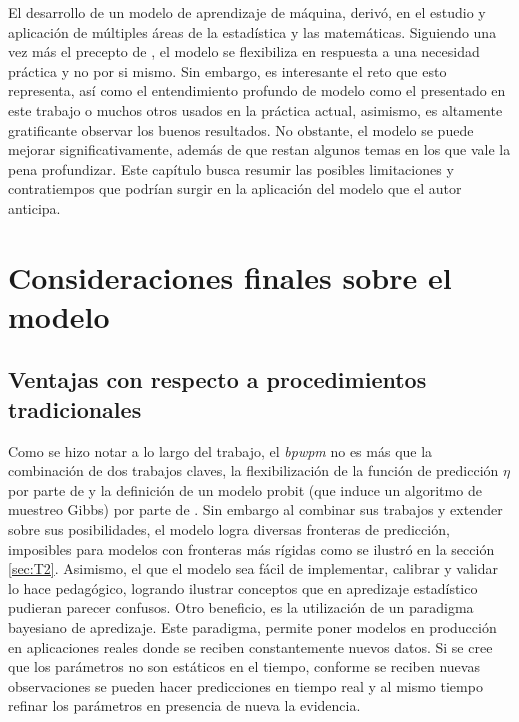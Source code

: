 \documentclass[../Main/Main.tex]{subfiles}
\begin{document}
El desarrollo de un modelo de aprendizaje de máquina, derivó, en el estudio y aplicación de múltiples áreas de la estadística y las matemáticas. Siguiendo una vez más el precepto de \citet{box1976science}, el modelo se flexibiliza en respuesta a una necesidad práctica y no por si mismo. Sin embargo, es interesante el reto que esto representa, así como el entendimiento profundo de modelo como el presentado en este trabajo o muchos otros usados en la práctica actual, asimismo, es altamente gratificante observar los buenos resultados. No obstante, el modelo se puede mejorar significativamente, además de que restan algunos temas en los que vale la pena profundizar. Este capítulo busca resumir las posibles limitaciones y contratiempos que podrían surgir en la aplicación del modelo que el autor anticipa.

\section{Consideraciones finales sobre el modelo}
\subsection*{Ventajas con respecto a procedimientos tradicionales}
Como se hizo notar a lo largo del trabajo, el \textit{bpwpm} no es más que la combinación de dos trabajos claves, la flexibilización de la función de predicción $\eta$ por parte de \citet{mallik1998automatic} y la definición de un modelo probit (que induce un algoritmo de muestreo Gibbs) por parte de \citet{albert1993bayesian}. Sin embargo al combinar sus trabajos y extender sobre sus posibilidades, el modelo logra diversas fronteras de predicción, imposibles para modelos con fronteras más rígidas como se ilustró en la sección \ref{sec:T2}. Asimismo, el que el modelo sea fácil de implementar, calibrar y validar lo hace pedagógico, logrando ilustrar conceptos que en apredizaje estadístico pudieran parecer confusos. Otro beneficio, es la utilización de un paradigma bayesiano de apredizaje. Este paradigma, permite poner modelos en producción en aplicaciones reales donde se reciben constantemente nuevos datos. Si se cree que los parámetros no son estáticos en el tiempo, conforme se reciben nuevas observaciones se pueden hacer predicciones en tiempo real y al mismo tiempo refinar los parámetros en presencia de nueva la evidencia.
\end{document}
